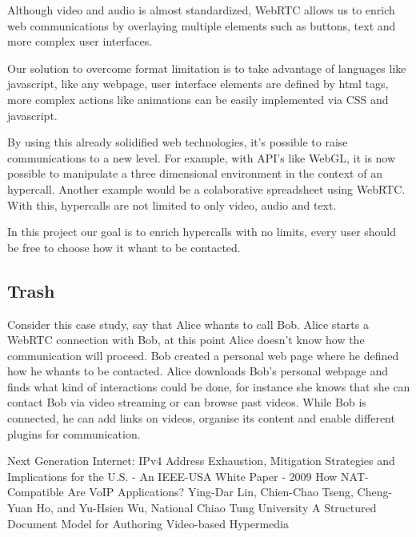 \documentclass[11pt,twocolumn]{article}
\begin{document}
Although video and audio is almost standardized, WebRTC allows us to enrich web communications by overlaying multiple elements such as buttons, text and more complex user interfaces.

Our solution to overcome format limitation is to take advantage of languages like javascript, like any webpage, user interface elements are defined by html tags, more complex actions like animations can be easily implemented via CSS and javascript.

By using this already solidified web technologies, it's possible to raise communications to a new level. For example, with API's like WebGL, it is now possible to manipulate a three dimensional environment in the context of an hypercall. Another example would be a colaborative spreadsheet using WebRTC. With this, hypercalls are not limited to only video, audio and text.

In this project our goal is to enrich hypercalls with no limits, every user should be free to choose how it whant to be contacted. 

\subsection{Trash}

{\color{red} 

Consider this case study, say that Alice whants to call Bob. Alice starts a WebRTC connection with Bob, at this point Alice doesn't know how the communication will proceed. Bob created a personal web page where he defined how he whants to be contacted. Alice downloads Bob's personal webpage and finds what kind of interactions could be done, for instance she knows that she can contact Bob via video streaming or can browse past videos. While Bob is connected, he can add links on videos, organise its content and enable different plugins for communication.
}
\begin{thebibliography}{9}


 Next Generation Internet: IPv4 Address Exhaustion, Mitigation Strategies and Implications for the U.S. - An IEEE-USA White Paper - 2009
 How NAT-Compatible Are VoIP Applications? Ying-Dar Lin, Chien-Chao Tseng, Cheng-Yuan Ho, and Yu-Hsien Wu, National Chiao Tung University
 A Structured Document Model for Authoring Video-based Hypermedia

\end{thebibliography}
\end{document}
